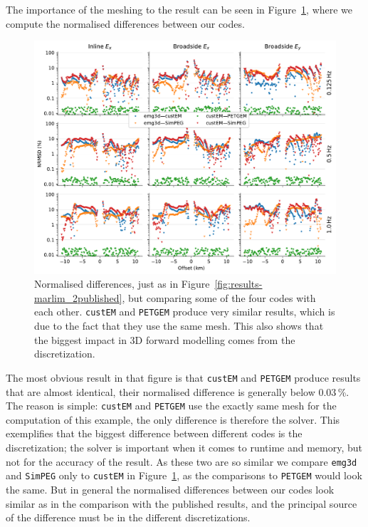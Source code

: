\documentclass[extra, camera,%
]{gji}
\newcommand{\emg}[2]{\texttt{emg#1#2}\xspace}
\newcommand{\simpeg}{\texttt{SimPEG}\xspace}
\newcommand{\custem}{\texttt{custEM}\xspace}
\newcommand{\petgem}{\texttt{PETGEM}\xspace}
\newcommand{\itodo}[1]{\todo[color=blue!40!white, inline]{\sffamily #1}}
\begin{document}
The importance of the meshing to the result can be seen in Figure~\ref{fig:results-marlim_2ours}, where we compute the normalised differences between our codes.
%
\begin{figure}
  \centering
  \includegraphics[width=.9\linewidth]{figures/results-marlim_2ours}
  \caption{\itodo{Improve figure.}Normalised differences, just as in Figure~\ref{fig:results-marlim_2published}, but comparing some of the four codes with each other. \custem and \petgem produce very similar results, which is due to the fact that they use the same mesh. This also shows that the biggest impact in 3D forward modelling comes from the discretization.}
  \label{fig:results-marlim_2ours}
\end{figure}
%
The most obvious result in that figure is that \custem and \petgem produce results that are almost identical, their normalised difference is generally below 0.03\,\%. The reason is simple: \custem and \petgem use the exactly same mesh for the computation of this example, the only difference is therefore the solver. This exemplifies that the biggest difference between different codes is the discretization; the solver is important when it comes to runtime and memory, but not for the accuracy of the result. As these two are so similar we compare \emg3d and \simpeg only to \custem in Figure~\ref{fig:results-marlim_2ours}, as the comparisons to \petgem would look the same. But in general the normalised differences between our codes look similar as in the comparison with the published results, and the principal source of the difference must be in the different discretizations.
\end{document}
